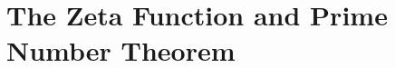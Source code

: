 \documentclass[../../main.tex]{subfiles}
\begin{document}
\chapter{The Zeta Function and Prime Number Theorem}
\end{document}
